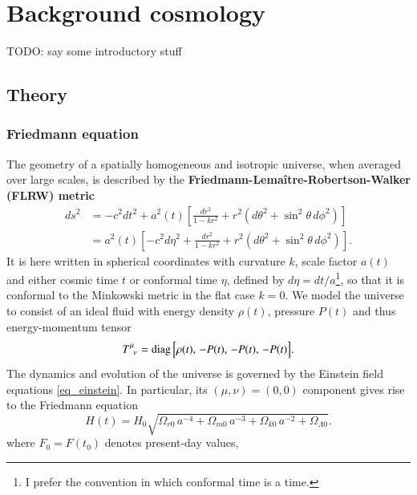 \documentclass{aa}
\DeclareMathOperator{\diag}{diag}
\begin{document}
\section{Background cosmology}

TODO: say some introductory stuff

\subsection{Theory}

\subsubsection{Friedmann equation}

The geometry of a spatially homogeneous and isotropic universe, when averaged over large scales,
is described by the \textbf{Friedmann-Lemaître-Robertson-Walker (FLRW) metric}
\begin{equation}
\begin{split}
	ds^2 &= -c^2 dt^2 + a^2(t) \left[\frac{dr^2}{1 - kr^2} + r^2\left(d\theta^2 + \sin^2\theta \, d\phi^2\right) \right] \\
	     &= a^2(t) \left[-c^2 d\eta^2 + \frac{dr^2}{1 - kr^2} + r^2\left(d\theta^2 + \sin^2\theta \, d\phi^2\right) \right].
\end{split}
\label{eq_flrw}
\end{equation}
It is here written in spherical coordinates with curvature $k$, scale factor $a(t)$ and either cosmic time $t$ or conformal time $\eta$,
defined by $d\eta = dt/a$\footnote{I prefer the convention in which conformal time is a time.}, so that it is conformal to the Minkowski metric in the flat case $k=0$.
We model the universe to consist of an ideal fluid with energy density $\rho(t)$, pressure $P(t)$ and thus energy-momentum tensor
\begin{equation}
	T\indices{^\mu_\nu} = \diag\Big[\rho(t),\, -P(t),\, -P(t),\, -P(t)\Big].
\label{eq_energy_momentum_homogeneous}
\end{equation}
The dynamics and evolution of the universe is governed by the Einstein field equations \eqref{eq_einstein}.
In particular, its $(\mu,\nu)=(0,0)$ component gives rise to the Friedmann equation
\begin{equation}
	H(t) = H_0 \sqrt{\Omega_{r0} \, a^{-4} + \Omega_{m0} \, a^{-3} + \Omega_{k0} \, a^{-2} + \Omega_{\Lambda0}}.
\label{eq_friedmann}
\end{equation}
where $F_0 = F(t_0)$ denotes present-day values,
\end{document}
